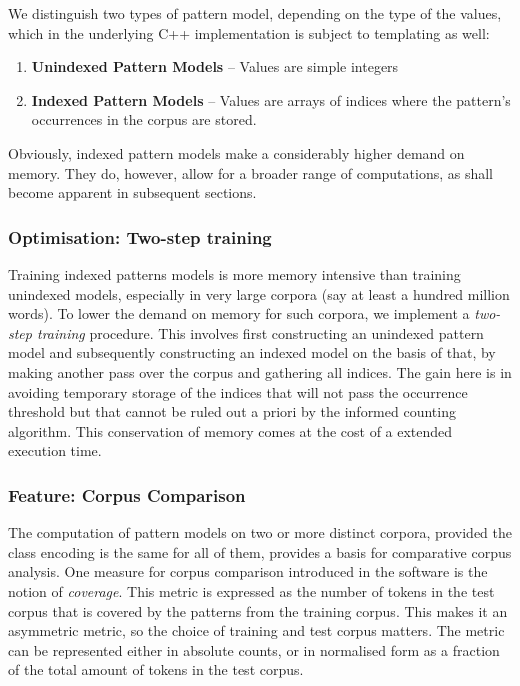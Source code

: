 \documentclass[a4paper,12pt]{article}
\begin{document}
We distinguish two types of pattern model, depending on the type of the values,
which in the underlying C++ implementation is subject to templating as well:

\begin{enumerate}
 \item \textbf{Unindexed Pattern Models} -- Values are simple integers
 \item \textbf{Indexed Pattern Models} -- Values are arrays of indices where
     the pattern's occurrences in the corpus are stored.
\end{enumerate}

Obviously, indexed pattern models make a considerably higher demand on memory.
They do, however, allow for a broader range of computations, as shall become
apparent in subsequent sections.

\subsubsection{Optimisation: Two-step training}

Training indexed patterns models is more memory intensive than training
unindexed models, especially in very large corpora (say at least a hundred
million words). To lower the demand on memory for such corpora, we implement a
\emph{two-step training} procedure. This involves first constructing an
unindexed pattern model and subsequently constructing an indexed model on the
basis of that, by making another pass over the corpus and gathering all
indices. The gain here is in avoiding temporary storage of the indices that
will not pass the occurrence threshold but that cannot be ruled out a priori by the
informed counting algorithm.  This conservation of memory comes at the cost of
a extended execution time.

\subsubsection{Feature: Corpus Comparison}

The computation of pattern models on two or more distinct corpora, provided the
class encoding is the same for all of them, provides a basis for comparative
corpus analysis. One measure for corpus comparison introduced in the software
is the notion of \emph{coverage}. This metric is expressed as the number of
tokens in the test corpus that is covered by the patterns from the training
corpus. This makes it an asymmetric metric, so the choice of training and test corpus
matters.  The metric can be represented either in absolute counts, or in
normalised form as a fraction of the total amount of tokens in the test corpus.
\end{document}
